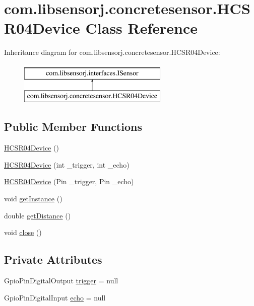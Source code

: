 \hypertarget{classcom_1_1libsensorj_1_1concretesensor_1_1HCSR04Device}{}\section{com.\+libsensorj.\+concretesensor.\+H\+C\+S\+R04\+Device Class Reference}
\label{classcom_1_1libsensorj_1_1concretesensor_1_1HCSR04Device}
Inheritance diagram for com.\+libsensorj.\+concretesensor.\+H\+C\+S\+R04\+Device\+:\begin{figure}[H]
\begin{center}
\leavevmode
\includegraphics[height=2.000000cm]{classcom_1_1libsensorj_1_1concretesensor_1_1HCSR04Device}
\end{center}
\end{figure}
\subsection*{Public Member Functions}
\begin{DoxyCompactItemize}
\item 
\hyperlink{classcom_1_1libsensorj_1_1concretesensor_1_1HCSR04Device_ae0c7cdd02e374f360dff8d06a59b7c6d}{H\+C\+S\+R04\+Device} ()
\item 
\hyperlink{classcom_1_1libsensorj_1_1concretesensor_1_1HCSR04Device_a1c5c889b5ffe83c5fe8f7263bb8c8d33}{H\+C\+S\+R04\+Device} (int \+\_\+trigger, int \+\_\+echo)
\item 
\hyperlink{classcom_1_1libsensorj_1_1concretesensor_1_1HCSR04Device_a5148b245ef2aa510af815ecb3aeeb18b}{H\+C\+S\+R04\+Device} (Pin \+\_\+trigger, Pin \+\_\+echo)
\item 
void \hyperlink{classcom_1_1libsensorj_1_1concretesensor_1_1HCSR04Device_a3395de7d81b875516fb5c539accb27d1}{get\+Instance} ()
\item 
double \hyperlink{classcom_1_1libsensorj_1_1concretesensor_1_1HCSR04Device_aa30e4f6775819a36bc231a226c397bef}{get\+Distance} ()
\item 
void \hyperlink{classcom_1_1libsensorj_1_1concretesensor_1_1HCSR04Device_a69a3472b508507649ccb57e6fef81d6c}{close} ()
\end{DoxyCompactItemize}
\subsection*{Private Attributes}
\begin{DoxyCompactItemize}
\item 
Gpio\+Pin\+Digital\+Output \hyperlink{classcom_1_1libsensorj_1_1concretesensor_1_1HCSR04Device_ac898198f98143f7a1a4f281ea3c7c607}{trigger} = null
\item 
Gpio\+Pin\+Digital\+Input \hyperlink{classcom_1_1libsensorj_1_1concretesensor_1_1HCSR04Device_adf8ec00f094aefba690583e5a349c99d}{echo} = null
\end{DoxyCompactItemize}
